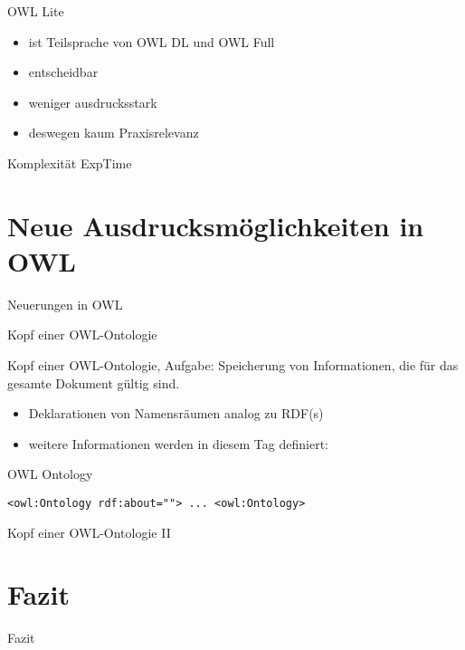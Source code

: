\documentclass{beamer}
\begin{document}
%
\begin{frame}{OWL Lite}
\begin{itemize}
	\item ist Teilsprache von OWL DL und OWL Full
	\item entscheidbar
	\item weniger ausdrucksstark
	\item deswegen kaum Praxisrelevanz
\end{itemize}
\begin{block}{Komplexität}
	ExpTime
\end{block}
\end{frame}


\section{Neue Ausdrucksmöglichkeiten in OWL}
\begin{frame}{Neuerungen in OWL}

\end{frame}

\begin{frame}[fragile]{Kopf einer OWL-Ontologie}
\begin{block}{Kopf einer OWL-Ontologie, Aufgabe:}
Speicherung von Informationen, die für das gesamte Dokument gültig sind.
\end{block}
\begin{itemize}
	\item Deklarationen von Namensräumen analog zu RDF(s)
	\item weitere Informationen werden in diesem  Tag definiert: 
\end{itemize}
\begin{block}{OWL Ontology}
\begin{lstlisting}[lang="xml"]
<owl:Ontology rdf:about=""> ... <owl:Ontology>
\end{lstlisting}
\end{block}
\end{frame}

\begin{frame}{Kopf einer OWL-Ontologie II}

\end{frame}




\section{Fazit}
\begin{frame}{Fazit}
\end{frame}
\end{document}
